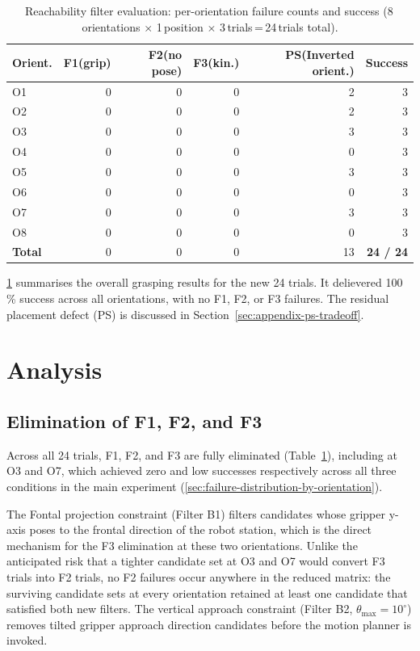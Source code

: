 \documentclass[12pt, a4paper]{report}
\begin{document}
\begin{table}[htbp]
  \centering
  \caption{Reachability filter evaluation: per-orientation failure counts and success (8\,orientations $\times$ 1\,position $\times$ 3\,trials\,=\,24\,trials total).}
  \label{tab:appendix-results}
  \begin{tabular}{lrrrrr}
    \toprule
    Orient. & F1(grip) & F2(no pose) & F3(kin.) & PS(Inverted orient.) & Success \\
    \midrule
    O1 & 0 & 0 & 0 & 2 & 3 \\
    O2 & 0 & 0 & 0 & 2 & 3 \\
    O3 & 0 & 0 & 0 & 3 & 3 \\
    O4 & 0 & 0 & 0 & 0 & 3 \\
    O5 & 0 & 0 & 0 & 3 & 3 \\
    O6 & 0 & 0 & 0 & 0 & 3 \\
    O7 & 0 & 0 & 0 & 3 & 3 \\
    O8 & 0 & 0 & 0 & 0 & 3 \\
    \midrule
    \textbf{Total} & 0 & 0 & 0 & 13 & \textbf{24 / 24} \\
    \bottomrule
  \end{tabular}
\end{table}

\cref{tab:appendix-results} summarises the overall grasping results for the new 24 trials. It delievered 100\,\% success across all orientations, with no F1, F2, or F3 failures. The residual placement defect (PS) is discussed in Section~\ref{sec:appendix-ps-tradeoff}.

\section{Analysis}
\label{sec:appendix-analysis}

\subsection{Elimination of F1, F2, and F3}
\label{sec:appendix-f1f3}

Across all 24 trials, F1, F2, and F3 are fully eliminated (Table~\ref{tab:appendix-results}), including at O3 and O7, which achieved zero and low successes respectively across all three conditions in the main experiment (\cref{sec:failure-distribution-by-orientation}).

The Fontal projection constraint (Filter B1) filters candidates whose gripper y-axis poses to the frontal direction of the robot station, which is the direct mechanism for the F3 elimination at these two orientations. Unlike the anticipated risk that a tighter candidate set at O3 and O7 would convert F3 trials into F2 trials, no F2 failures occur anywhere in the reduced matrix: the surviving candidate sets at every orientation retained at least one candidate that satisfied both new filters.  The vertical approach constraint (Filter B2, $\theta_{\max} = 10^{\circ}$) removes tilted gripper approach direction candidates before the motion planner is invoked.
\end{document}
